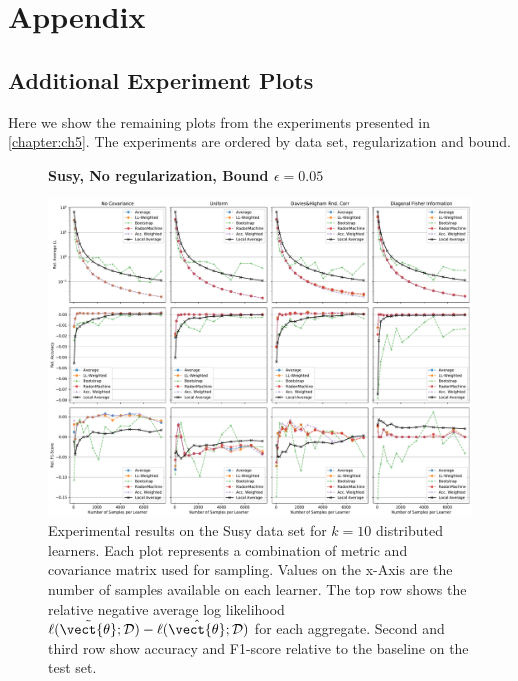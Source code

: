 \chapter{Appendix}
\label{ch:apdx}
\section{Additional Experiment Plots}
Here we show the remaining plots from the experiments presented in \autoref{chapter:ch5}.
The experiments are ordered by data set, regularization and bound. 
\label{sec:apdx:exp}

    \begin{landscape}
    \begin{figure}
        \centering
        \textbf{Susy, No regularization, Bound $\epsilon=0.05$}\par\medskip
        \includegraphics[height=\dimexpr \textheight - 4\baselineskip\relax]{kapitel/figures/susy_None_0.05_neg_relative.pdf}
        \caption[Susy without regularization and $\epsilon=0.05$]{Experimental results on the Susy data set for $k=10$ distributed learners. Each plot represents a combination of metric and covariance matrix used for sampling. Values on the x-Axis are the number of samples available on each learner. The top row shows the relative negative average log likelihood $\ell(\tilde{\vect{\theta}}; \mathcal{D}) - \ell(\hat{\vect{\theta}}; \mathcal{D})$ for each aggregate. Second and third row show accuracy and F1-score relative to the baseline on the test set.}
        \label{fig:analysis5}
    \end{figure}
    \end{landscape}
